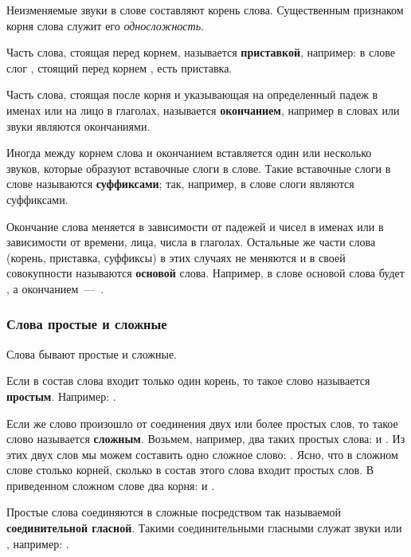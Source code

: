 \documentclass[11pt,a4paper,oneside]{memoir}
\begin{document}
    Неизменяемые звуки в слове составляют корень слова. Существенным признаком корня слова служит его \emph{односложность}.
    
    Часть слова, стоящая перед корнем, называется \textbf{приставкой}, например: в слове {} слог {}, стоящий перед корнем {}, есть приставка.
    
    Часть слова, стоящая после корня и указывающая на определенный падеж в именах или на лицо в глаголах, называется \textbf{окончанием}, например в словах {} или {} звуки {} являются окончаниями.
    
    Иногда между корнем слова и окончанием вставляется один или несколько звуков, которые образуют вставочные слоги в слове. Такие вставочные слоги в слове называются \textbf{суффиксами}; так, например, в слове {} слоги {} являются суффиксами.
    
    Окончание слова меняется в зависимости от падежей и чисел в именах или в зависимости от времени, лица, числа в глаголах. Остальные же части слова (корень, приставка, суффиксы) в этих случаях не меняются и в своей совокупности называются \textbf{основой} слова. Например, в слове {} основой слова будет {}, а окончанием~---~{}.

                \subsubsection{Слова простые и сложные}

    Слова бывают простые и сложные.
    
    Если в состав слова входит только один корень, то такое слово называется \textbf{простым}. Например: {}.
    
    Если же слово произошло от соединения двух или более простых слов, то такое слово называется \textbf{сложным}. Возьмем, например, два таких простых слова: {} и {}. Из этих двух слов мы можем составить одно сложное слово: {}. Ясно, что в сложном слове столько корней, сколько в состав этого слова входит простых слов. В приведенном сложном слове {} два корня: {} и {}.
    
    Простые слова соединяются в сложные посредством так называемой \textbf{соединительной гласной}. Такими соединительными гласными служат звуки {} или {}, например: {}.
\end{document}
